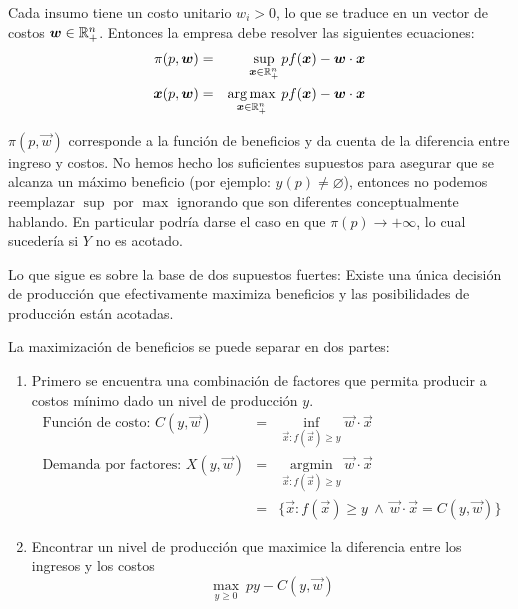 Cada insumo tiene un costo unitario $w_i>0$, lo que se traduce en un vector de costos $\boldsymbol{w}\in \mathbb{R}^n_+$. Entonces la empresa debe resolver las siguientes ecuaciones:
\begin{eqnarray*}
\pi(p,\boldsymbol{w})&=&\sup_{\boldsymbol{x}\in \mathbb{R}^n_+} p f(\boldsymbol{x}) - \boldsymbol{w}\cdot \boldsymbol{x} \\
\boldsymbol{x}(p,\boldsymbol{w})&=&\operatorname*{arg\max}_{\boldsymbol{x}\in \mathbb{R}^n_+} \:p f(\boldsymbol{x})-\boldsymbol{w}\cdot \boldsymbol{x}
\end{eqnarray*}


$\pi(p,\vec{w})$ corresponde a la funci\'on de beneficios y da cuenta de la diferencia entre ingreso y costos. No hemos hecho los suficientes supuestos para asegurar que se alcanza un m\'aximo beneficio (por ejemplo: $y(p)\neq \varnothing$), entonces no podemos reemplazar $\sup$ por $\max$ ignorando que son diferentes conceptualmente hablando. En particular podr\'ia darse el caso en que $\pi(p)\to +\infty$, lo cual suceder\'ia si $Y$ no es acotado.

Lo que sigue es sobre la base de dos supuestos fuertes: Existe una \'unica decisi\'on de producci\'on que efectivamente maximiza beneficios y las posibilidades de producci\'on est\'an acotadas.

La maximizaci\'on de beneficios se puede separar en dos partes:
\begin{enumerate}
\item Primero se encuentra una combinaci\'on de factores que permita producir a costos m\'inimo dado un nivel de producci\'on $y$.
\begin{eqnarray*}
\text{Funci\'on de costo: } C(y,\vec{w})&=& \inf_{\vec{x} : f(\vec{x})\geq y} \vec{w}\cdot \vec{x} \\
\text{Demanda por factores: } X(y,\vec{w}) &=& \operatorname*{arg\min}_{\vec{x} : f(\vec{x})\geq y} \vec{w}\cdot \vec{x} \\
&=& \{\vec{x} : f(\vec{x})\geq y \:\wedge\: \vec{w}\cdot \vec{x} = C(y,\vec{w})\}
\end{eqnarray*}
\item Encontrar un nivel de producci\'on que maximice la diferencia entre los ingresos y los costos 
$$\max_{y\geq 0} \: py - C(y,\vec{w})$$
\end{enumerate}

